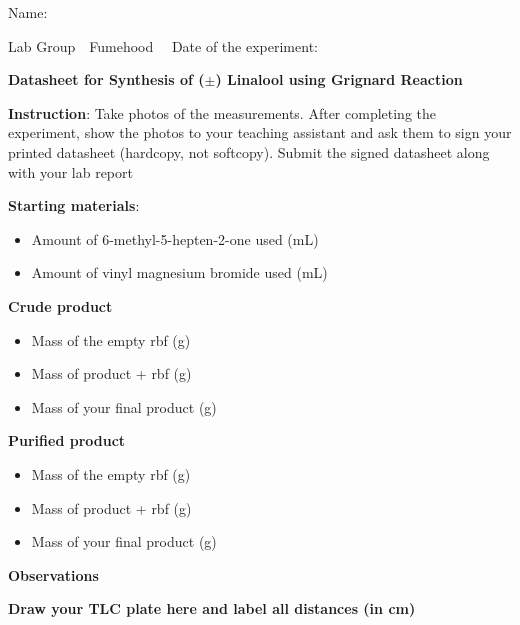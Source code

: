 \documentclass[10pt,a4paper]{article}
\begin{document}
\newpage
\thispagestyle{official}
\begingroup
\fontsize{12}{17}\selectfont
\newcommand{\blank}[1]{\underline{\hspace{#1}}}
Name: \blank{9.5cm}\par\vspace{10pt}
Lab Group\blank{1.6cm}\ \ Fumehood \blank{1.6cm}\ \ Date of the experiment: \blank{3.2cm}\par\vspace{14pt}
\begin{center}{\bfseries Datasheet for Synthesis of ($\pm$) Linalool using Grignard Reaction}\end{center}
\vspace{2pt}
\textbf{Instruction}: Take photos of the measurements. After completing the experiment, show the photos to your teaching assistant and ask them to sign your printed datasheet (hardcopy, not softcopy). Submit the signed datasheet along with your lab report\par\vspace{12pt}
\textbf{Starting materials}:\par\vspace{4pt}
\begin{itemize}[leftmargin=1.6em,itemsep=8pt,topsep=2pt]
\item Amount of 6-methyl-5-hepten-2-one used (mL)\blank{4.2cm}
\item Amount of vinyl magnesium bromide used (mL)\blank{4.2cm}
\end{itemize}
\vspace{8pt}
\textbf{Crude product}\par\vspace{4pt}
\begin{itemize}[leftmargin=1.6em,itemsep=8pt,topsep=2pt]
\item Mass of the empty rbf (g)\blank{4.2cm}
\item Mass of product + rbf (g) \blank{4.2cm}
\item Mass of your final product (g) \blank{4.2cm}
\end{itemize}
\vspace{8pt}
\textbf{Purified product}\par\vspace{4pt}
\begin{itemize}[leftmargin=1.6em,itemsep=8pt,topsep=2pt]
\item Mass of the empty rbf (g)\blank{4.2cm}
\item Mass of product + rbf (g) \blank{4.2cm}
\item Mass of your final product (g) \blank{4.2cm}
\end{itemize}
\vspace{8pt}
\textbf{Observations}\par
\vspace{4.2cm}
\textbf{Draw your TLC plate here and label all distances (in cm)}\par
\vfill
\endgroup
\end{document}
